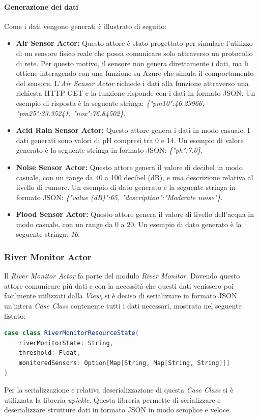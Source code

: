 \documentclass[12pt]{article}
\begin{document}
\paragraph{Generazione dei dati}
Come i dati vengono generati è illustrato di seguito:
\begin{itemize}
    \item \textbf{Air Sensor Actor:} Questo attore è stato progettato per simulare l'utilizzo di un sensore fisico reale che possa comunicare solo attraverso un protocollo di rete. Per questo motivo, il sensore non genera direttamente i dati, ma li ottiene interagendo con una funzione su Azure che simula il comportamento del sensore. L'\textit{Air Sensor Actor} richiede i dati alla funzione attraverso una richiesta HTTP GET e la funzione risponde con i dati in formato JSON. Un esempio di risposta è la seguente stringa: \textit{\{"pm10":46.29966, "pm25":33.35241, "nox":76.84502\}}.
    \item \textbf{Acid Rain Sensor Actor:} Questo attore genera i dati in modo casuale. I dati generati sono valori di pH compresi tra 0 e 14. Un esempio di valore generato è la seguente stringa in formato JSON: \textit{\{"ph":7.0\}}.
    \item \textbf{Noise Sensor Actor:} Questo attore genera il valore di decibel in modo casuale, con un range da 40 a 100 decibel (dB), e una descrizione relativa al livello di rumore. Un esempio di dato generato è la seguente stringa in formato JSON: \textit{\{"value (dB)":65, "description":"Moderate noise"\}}.
    \item \textbf{Flood Sensor Actor:} Questo attore genera il valore di livello dell'acqua in modo casuale, con un range da 0 a 20. Un esempio di dato generato è la seguente stringa: \textit{16}.
\end{itemize}

\subsubsection{River Monitor Actor}
Il \textit{River Monitor Actor} fa parte del modulo \textit{River Monitor}. Dovendo questo attore comunicare più dati e con la necessità che questi dati venissero poi facilmente utilizzati dalla \textit{View}, si è deciso di serializzare in formato JSON un'intera \textit{Case Class} contenente tutti i dati necessari, mostrata nel seguente listato:
\begin{lstlisting}[language=Scala]
case class RiverMonitorResourceState(
    riverMonitorState: String,
    threshold: Float,
    monitoredSensors: Option[Map[String, Map[String, String]]]
)
\end{lstlisting}
Per la serializzazione e relativa deserializzazione di questa \textit{Case Class} si è utilizzata la libreria \textit{upickle}. Questa libreria permette di serializzare e deserializzare strutture dati in formato JSON in modo semplice e veloce.
\end{document}
